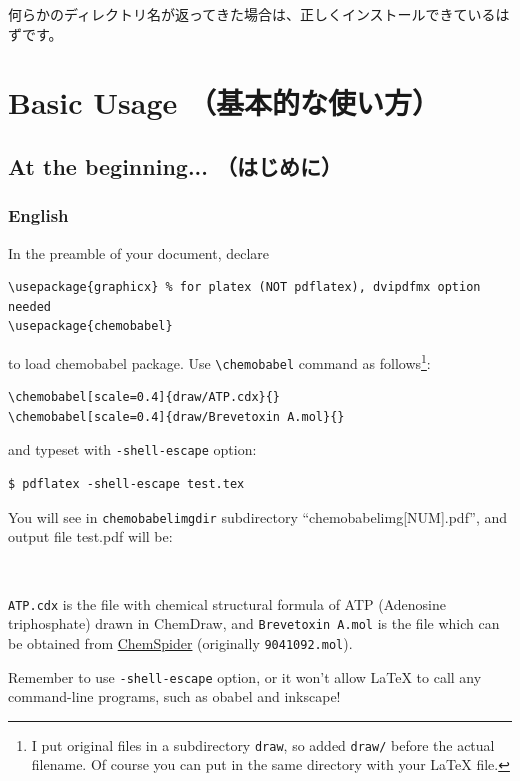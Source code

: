 \documentclass[12pt]{jsarticle}
\begin{document}
何らかのディレクトリ名が返ってきた場合は、正しくインストールできているはずです。

\clearpage

\section{Basic Usage （基本的な使い方）} \label{basic}

\subsection{At the beginning... （はじめに）}

\subsubsection{English}
In the preamble of your document, declare
\begin{verbatim}
\usepackage{graphicx} % for platex (NOT pdflatex), dvipdfmx option needed
\usepackage{chemobabel}
\end{verbatim}
to load \textsf{chemobabel} package. Use \verb|\chemobabel| command as follows\footnote{I put original files in a subdirectory \texttt{draw}, so added \texttt{draw/} before the actual filename. Of course you can put in the same directory with your {\LaTeX} file.}:
\begin{verbatim}
\chemobabel[scale=0.4]{draw/ATP.cdx}{}
\chemobabel[scale=0.4]{draw/Brevetoxin A.mol}{}
\end{verbatim}
and typeset with \verb|-shell-escape| option:
\begin{verbatim}
$ pdflatex -shell-escape test.tex
\end{verbatim}
You will see in \verb|chemobabelimgdir| subdirectory ``chemobabelimg[NUM].pdf'', and output file test.pdf will be:
\begin{figure}[h]
  \centering
   \\
\end{figure}

\verb|ATP.cdx| is the file with chemical structural formula of ATP (Adenosine triphosphate) drawn in ChemDraw, and \verb|Brevetoxin A.mol| is the file which can be obtained from \href{http://www.chemspider.com/}{ChemSpider} (originally \verb|9041092.mol|).

Remember to use \verb|-shell-escape| option, or it won't allow {\LaTeX} to call any command-line programs, such as obabel and inkscape!
\end{document}
